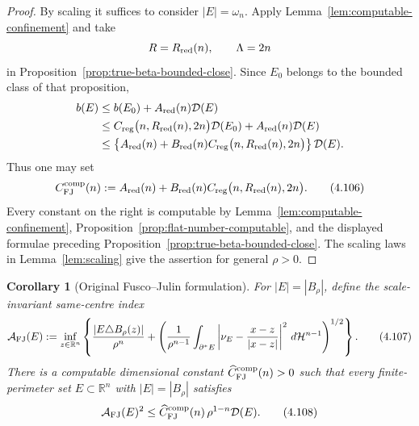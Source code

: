 \documentclass[11pt]{amsart}
\newtheorem{corollary}[theorem]{Corollary}
\theoremstyle{definition}
\newcommand{\R}{\mathbb R}
\newcommand{\Hn}{\mathcal H^{n-1}}
\newcommand{\Def}{\mathcal D}
\begin{document}
\begin{proof}
By scaling it suffices to consider \(|E|=\omega_n\).  Apply
Lemma~\ref{lem:computable-confinement} and take
\[
   R=R_{\rm red}(n),\qquad \Lambda=2n
\]
in Proposition~\ref{prop:true-beta-bounded-close}.  Since \(E_0\)
belongs to the bounded class of that proposition,
\[
\begin{aligned}
   b(E)
   &\le b(E_0)+A_{\rm red}(n)\Def(E)\\
   &\le C_{\rm reg}\bigl(n,R_{\rm red}(n),2n\bigr)\Def(E_0)
          +A_{\rm red}(n)\Def(E)\\
   &\le
     \left\{A_{\rm red}(n)
       +B_{\rm red}(n)C_{\rm reg}
             \bigl(n,R_{\rm red}(n),2n\bigr)\right\}\Def(E).
\end{aligned}
\]
Thus one may set
\[
   C_{\rm FJ}^{\rm comp}(n)
   :=
   A_{\rm red}(n)
       +B_{\rm red}(n)C_{\rm reg}
             \bigl(n,R_{\rm red}(n),2n\bigr).
\tag{4.106}\label{eq:CFJ-computable}
\]
Every constant on the right is computable by
Lemma~\ref{lem:computable-confinement},
Proposition~\ref{prop:flat-number-computable}, and the displayed
formulae preceding Proposition~\ref{prop:true-beta-bounded-close}.
The scaling laws in Lemma~\ref{lem:scaling} give the assertion for
general \(\rho>0\).
\end{proof}

\begin{corollary}[Original Fusco--Julin formulation]
\label{cor:original-FJ-computable}
For \(|E|=|B_\rho|\), define the scale-invariant same-centre index
\[
   \mathcal A_{\rm FJ}(E)
   :=
   \inf_{z\in\R^n}
   \left\{
      \frac{|E\triangle B_\rho(z)|}{\rho^n}
      +
      \left(
         \frac1{\rho^{n-1}}
         \int_{\partial^*E}
         \left|\nu_E-\frac{x-z}{|x-z|}\right|^2\,d\Hn
      \right)^{1/2}
   \right\}.
\tag{4.107}\label{eq:A-FJ-combined}
\]
There is a computable dimensional constant
\(\widehat C_{\rm FJ}^{\rm comp}(n)>0\) such that every
finite-perimeter set \(E\subset\R^n\) with \(|E|=|B_\rho|\) satisfies
\[
   \mathcal A_{\rm FJ}(E)^2
      \le \widehat C_{\rm FJ}^{\rm comp}(n)\,
          \rho^{1-n}\Def(E).
\tag{4.108}\label{eq:original-FJ-computable}
\]
\end{corollary}
\end{document}
